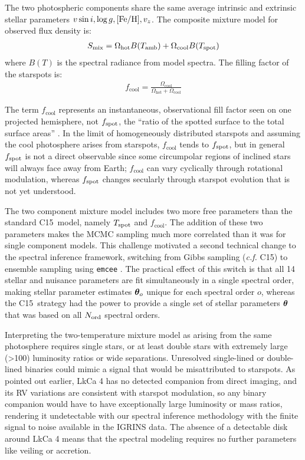 \documentclass[twocolumn]{emulateapj}%
\newcommand{\iancze}{{\sc C15}}
\begin{document}
The two photospheric components share the same average intrinsic and extrinsic stellar parameters $v \sin i, \log g, [{\rm Fe}/{\rm H}], v_z$.  The composite mixture model for observed flux density is:
\begin{eqnarray} \label{eqn:mix_M}
S_{\mathrm{mix}} = \Omega_{\mathrm{hot}} B(T_\textrm{amb})  + \Omega_{\mathrm{cool}} B(T_\textrm{spot})
\end{eqnarray}
where $B(T)$ is the spectral radiance from model spectra.  The filling factor of the starspots is:
\begin{eqnarray} \label{eqn:fill_factor}
f_{\mathrm{cool}} = \frac{\Omega_{\mathrm{cool}}}{\Omega_{\mathrm{hot}} + \Omega_{\mathrm{cool}}}
\end{eqnarray}

The term $f_{\mathrm{cool}}$ represents an instantaneous, observational fill factor seen on one projected hemisphere, not $f_{\rm spot}$, the ``ratio of the spotted surface to the total surface areas'' \citep{somers15}.  In the limit of homogeneously distributed starspots and assuming the cool photosphere arises from starspots, $f_{\mathrm{cool}}$ tends to $f_{\rm spot}$, but in general $f_{\rm spot}$ is not a direct observable since some circumpolar regions of inclined stars will always face away from Earth; $f_{\mathrm{cool}}$ can vary cyclically through rotational modulation, whereas $f_{\rm spot}$ changes secularly through starspot evolution that is not yet understood.

The two component mixture model includes two more free parameters than the standard \iancze\ model, namely $T_\textrm{spot}$ and $f_{\mathrm{cool}}$.  The addition of these two parameters makes the MCMC sampling much more correlated than it was for single component models.  This challenge motivated a second technical change to the spectral inference framework, switching from Gibbs sampling (\emph{c.f.} \iancze) to ensemble sampling using \texttt{emcee} \citep{foreman13}.  The practical effect of this switch is that all 14 stellar and nuisance parameters are fit simultaneously in a single spectral order, making stellar parameter estimates ${\bm \theta}_{o}$ unique for each spectral order $o$, whereas the \iancze\ strategy had the power to provide a single set of stellar parameters ${\bm \theta}$ that was based on all $N_{\rm ord}$ spectral orders.

Interpreting the two-temperature mixture model as arising from the same photosphere requires single stars, or at least double stars with extremely large (>100) luminosity ratios or wide separations.  Unresolved single-lined or double-lined binaries could mimic a signal that would be misattributed to starspots.  As pointed out earlier, LkCa 4 has no detected companion from direct imaging, and its RV variations are consistent with starspot modulation, so any binary companion would have to have exceptionally large luminosity or mass ratios, rendering it undetectable with our spectral inference methodology with the finite signal to noise available in the IGRINS data.  The absence of a detectable disk around LkCa 4 means that the spectral modeling requires no further parameters like veiling or accretion.
\end{document}
